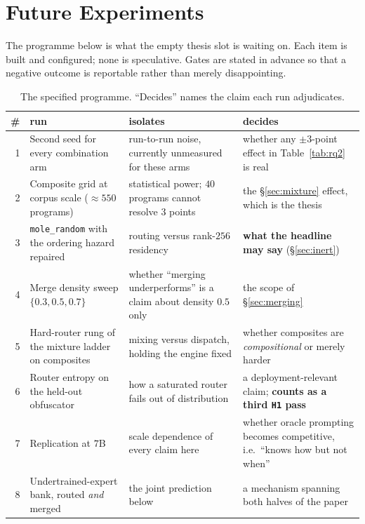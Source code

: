 \documentclass[sigconf,review,anonymous]{acmart}
\newcommand{\arm}[1]{\texttt{#1}}
\newcommand{\cond}[1]{\texttt{#1}}
\begin{document}
\section{Future Experiments}
\label{sec:future}

The programme below is what the empty thesis slot is waiting on. Each item is built and
configured; none is speculative. Gates are stated in advance so that a negative outcome is
reportable rather than merely disappointing.

\begin{table}[t]
\caption{The specified programme. ``Decides'' names the claim each run adjudicates.}
\label{tab:future}
\small
\begin{tabular}{@{}rp{4.3cm}p{4.6cm}p{5.0cm}@{}}
\toprule
\# & run & isolates & decides \\
\midrule
1 & Second seed for every combination arm & run-to-run noise, currently unmeasured for these arms & whether any $\pm3$-point effect in Table~\ref{tab:rq2} is real \\
2 & Composite grid at corpus scale ($\approx$$550$ programs) & statistical power; $40$ programs cannot resolve $3$ points & the \S\ref{sec:mixture} effect, which is the thesis \\
3 & \arm{mole\_random} with the ordering hazard repaired & routing versus rank-$256$ residency & \textbf{what the headline may say} (\S\ref{sec:inert}) \\
4 & Merge density sweep $\{0.3, 0.5, 0.7\}$ & whether ``merging underperforms'' is a claim about density $0.5$ only & the scope of \S\ref{sec:merging} \\
5 & Hard-router rung of the mixture ladder on composites & mixing versus dispatch, holding the engine fixed & whether composites are \emph{compositional} or merely harder \\
6 & Router entropy on the held-out obfuscator & how a saturated router fails out of distribution & a deployment-relevant claim; \textbf{counts as a third \cond{H1} pass} \\
7 & Replication at $7$B & scale dependence of every claim here & whether oracle prompting becomes competitive, i.e.\ ``knows how but not when'' \\
8 & Undertrained-expert bank, routed \emph{and} merged & the joint prediction below & a mechanism spanning both halves of the paper \\
\bottomrule
\end{tabular}
\end{table}
\end{document}
